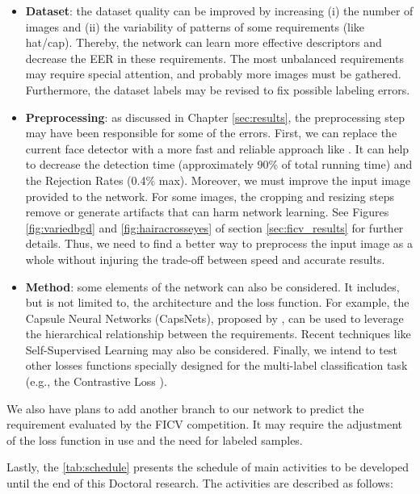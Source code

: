 \begin{itemize}
\item \textbf{Dataset}: the dataset quality can be improved by increasing (i) the number of images and (ii) the variability of patterns of some requirements (like hat/cap). Thereby, the network can learn more effective descriptors and decrease the EER in these requirements. The most unbalanced requirements may require special attention, and probably more images must be gathered. Furthermore, the dataset labels may be revised to fix possible labeling errors.

\item \textbf{Preprocessing}: as discussed in Chapter \ref{sec:results}, the preprocessing step may have been responsible for some of the errors. First, we can replace the current face detector with a more fast and reliable approach like \cite{faceboxes}. It can help to decrease the detection time (approximately 90\% of total running time) and the Rejection Rates (0.4\% max). Moreover, we must improve the input image provided to the network. For some images, the cropping and resizing steps remove or generate artifacts that can harm network learning. See Figures \ref{fig:variedbgd} and \ref{fig:hairacrosseyes} of section \ref{sec:ficv_results} for further details. Thus, we need to find a better way to preprocess the input image as a whole without injuring the trade-off between speed and accurate results.

\item \textbf{Method}: some elements of the network can also be considered. It includes, but is not limited to, the architecture and the loss function. For example, the Capsule Neural Networks (CapsNets), proposed by \cite{sabour2017dynamic}, can be used to leverage the hierarchical relationship between the requirements. Recent techniques like Self-Supervised Learning \citep{doersch2017multi} may also be considered. Finally, we intend to test other losses functions specially designed for the multi-label classification task (e.g., the Contrastive Loss \citep{khosla2020supervised}).
\end{itemize}

We also have plans to add another branch to our network to predict the \eyecenterlocation requirement evaluated by the FICV competition. It may require the adjustment of the loss function in use and the need for labeled samples.



Lastly, the \autoref{tab:schedule} presents the schedule of main activities to be developed until the end of this Doctoral research. The activities are described as follows:

